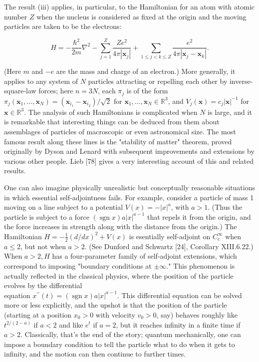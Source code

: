 \documentclass[10pt, letterpaper]{article}
\begin{document}
The result (iii) applies, in particular, to the Hamiltonian for an atom with atomic number $Z$ when the nucleus is considered as fixed at the origin and the moving particles are taken to be the electrons:

$$
H=-\frac{\hbar^{2}}{2 m} \nabla^{2}-\sum_{j=1}^{Z} \frac{Z e^{2}}{4 \pi\left|\mathbf{x}_{j}\right|}+\sum_{1 \leq j<k \leq Z} \frac{e^{2}}{4 \pi\left|\mathbf{x}_{j}-\mathbf{x}_{k}\right|} .
$$

(Here $m$ and $-e$ are the mass and charge of an electron.) More generally, it applies to any system of $N$ particles attracting or repelling each other by inverse-square-law forces; here $n=3 N$, each $\pi_{j}$ is of the form $\pi_{j}\left(\mathbf{x}_{1}, \ldots, \mathbf{x}_{N}\right)=\left(\mathbf{x}_{i_{1}}-\mathbf{x}_{i_{2}}\right) / \sqrt{2}$ for $\mathbf{x}_{1}, \ldots, \mathbf{x}_{N} \in \mathbb{R}^{3}$, and $V_{j}(\mathbf{x})=c_{j}|\mathbf{x}|^{-1}$ for $\mathbf{x} \in \mathbb{R}^{3}$. The analysis of such Hamiltonians is complicated when $N$ is large, and it is remarkable that interesting things can be deduced from them about assemblages of particles of macroscopic or even astronomical size. The most famous result along these lines is the "stability of matter" theorem, proved originally by Dyson and Lenard with subsequent improvements and extensions by various other people. Lieb [78] gives a very interesting account of this and related results.

One can also imagine physically unrealistic but conceptually reasonable situations in which essential self-adjointness fails. For example, consider a particle of mass 1 moving on a line subject to a potential $V(x)=-|x|^{a}$, with $a>1$. (Thus the particle is subject to a force $(\operatorname{sgn} x) a|x|^{a-1}$ that repels it from the origin, and the force increases in strength along with the distance from the origin.) The Hamiltonian $H=-\frac{1}{2}(d / d x)^{2}+V(x)$ is esentially self-adjoint on $C_{c}^{\infty}$ when $a \leq 2$, but not when $a>2$. (See Dunford and Schwartz [24], Corollary XIII.6.22.) When $a>2, H$ has a four-parameter family of self-adjoint extensions, which correspond to imposing "boundary conditions at $\pm \infty$." This phenomenon is actually reflected in the classical physics, where the position of the particle evolves by the differential\\
equation $x^{\prime \prime}(t)=(\operatorname{sgn} x) a|x|^{a-1}$. This differential equation can be solved more or less explicitly, and the upshot is that the position of the particle (starting at a position $x_{0}>0$ with velocity $v_{0}>0$, say) behaves roughly like $t^{2 /(2-a)}$ if $a<2$ and like $e^{t}$ if $a=2$, but it reaches infinity in a finite time if $a>2$. Classically, that's the end of the story; quantum mechanically, one can impose a boundary condition to tell the particle what to do when it gets to infinity, and the motion can then continue to further times.
\end{document}
